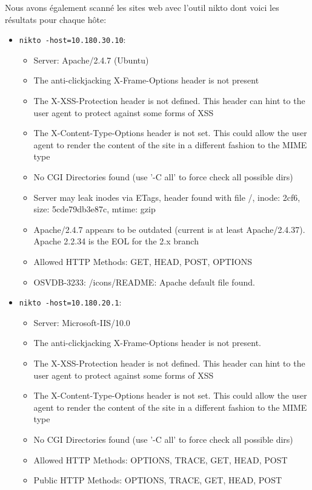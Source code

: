 \documentclass[french,paper=a4,oneside,captions=tableheading]{article}
\begin{document}
Nous avons également scanné les sites web avec l'outil nikto dont voici les résultats pour chaque hôte:
\begin{itemize}
    \item \texttt{nikto -host=10.180.30.10}:
    \begin{itemize}
        \item Server: Apache/2.4.7 (Ubuntu)
        \item The anti-clickjacking X-Frame-Options header is not present
        \item The X-XSS-Protection header is not defined. This header can hint to the user agent to protect against some forms of XSS
        \item The X-Content-Type-Options header is not set. This could allow the user agent to render the content of the site in a different fashion to the MIME type
        \item No CGI Directories found (use '-C all' to force check all possible dirs)
        \item Server may leak inodes via ETags, header found with file /, inode: 2cf6, size: 5cde79db3e87c, mtime: gzip
        \item Apache/2.4.7 appears to be outdated (current is at least Apache/2.4.37). Apache 2.2.34 is the EOL for the 2.x branch
        \item Allowed HTTP Methods: GET, HEAD, POST, OPTIONS
        \item OSVDB-3233: /icons/README: Apache default file found.
    \end{itemize}
    \item \texttt{nikto -host=10.180.20.1}:
    \begin{itemize}
        \item Server: Microsoft-IIS/10.0
        \item The anti-clickjacking X-Frame-Options header is not present.
        \item The X-XSS-Protection header is not defined. This header can hint to the user agent to protect against some forms of XSS
        \item The X-Content-Type-Options header is not set. This could allow the user agent to render the content of the site in a different fashion to the MIME type
        \item No CGI Directories found (use '-C all' to force check all possible dirs)
        \item Allowed HTTP Methods: OPTIONS, TRACE, GET, HEAD, POST
        \item Public HTTP Methods: OPTIONS, TRACE, GET, HEAD, POST

\end{itemize}
\end{itemize}
\end{document}
